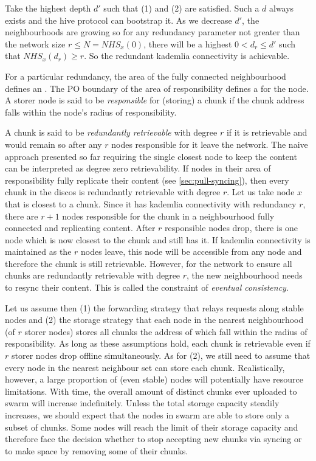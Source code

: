 Take the highest depth $d'$ such that (1) and (2) are satisfied. Such a $d$ always exists and the hive protocol can bootstrap it. As we decrease $d'$, the neighbourhoods are growing so  for any redundancy parameter not greater than the network size $r\leq N=\mathit{NHS}_x(0)$, there will be a highest $0<d_r\leq d'$ such that $\mathit{NHS}_x(d_r)\geq r$. So the redundant kademlia connectivity is achievable. 

For a particular redundancy, the area of the fully connected neighbourhood defines an . The PO boundary of the area of responsibility defines a  for the node. A storer node is said to be \emph{responsible} for (storing) a chunk if the chunk address falls within the node's radius of responsibility. 

A chunk is said to be \emph{redundantly retrievable} with degree $r$ if it is retrievable and would remain so after any $r$  nodes responsible for it leave the network. The naive approach presented so far requiring the single closest node to keep the content can be interpreted as degree zero retrievability. If nodes in their area of responsibility fully replicate  their content (see \ref{sec:pull-syncing}), then every chunk in the discos is redundantly retrievable with degree $r$. Let us take node $x$ that is closest to a chunk. Since it has kademlia connectivity with redundancy $r$, there are $r+1$ nodes responsible for the chunk in a neighbourhood fully connected and replicating content. After $r$ responsible nodes drop, there is one node which is now closest to the chunk and still has it. If kademlia connectivity is maintained as the $r$ nodes leave, this node will be accessible from any node and therefore the chunk is still retrievable. However, for the network to ensure all chunks are redundantly retrievable with degree $r$, the new neighbourhood needs to resync their content. This is called the constraint of \emph{eventual consistency}.

Let us assume then (1) the forwarding strategy that relays requests along stable nodes and (2) the storage strategy that each node in the nearest neighbourhood (of $r$ storer nodes) stores all chunks the address of which fall within the radius of responsibility. As long as these assumptions hold, each chunk is retrievable even if $r$ storer nodes drop offline simultaneously. As for (2), we still need to assume that every node in the nearest neighbour set can store each chunk. Realistically, however, a large proportion of (even stable) nodes will potentially have resource limitations. With time, the overall amount of distinct chunks ever uploaded to swarm will increase indefinitely. Unless the total storage capacity steadily increases, we should expect that the nodes in swarm are able to store only a subset of chunks. Some nodes will reach the limit of their storage capacity and therefore face the decision whether to stop accepting new chunks via syncing  or to make space by removing some of their chunks. 

